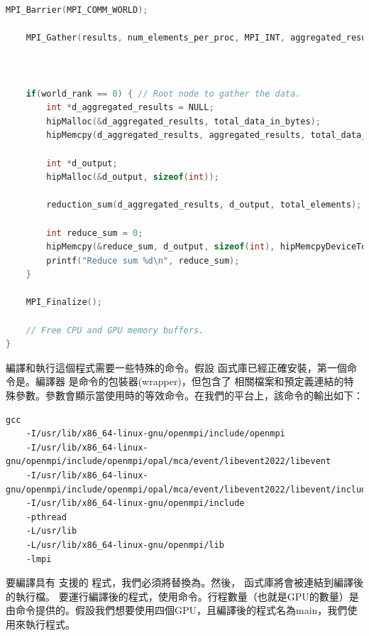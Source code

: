 \begin{lstlisting}[language=C, caption={用MPI設計多GPU程式}, captionpos=t, label={lst:multGPUs_mpi}]
    MPI_Barrier(MPI_COMM_WORLD);
    
    MPI_Gather(results, num_elements_per_proc, MPI_INT, aggregated_results, num_elements_per_proc, MPI_INT, 0, MPI_COMM_WORLD);



    if(world_rank == 0) { // Root node to gather the data.
        int *d_aggregated_results = NULL;
        hipMalloc(&d_aggregated_results, total_data_in_bytes);
        hipMemcpy(d_aggregated_results, aggregated_results, total_data_in_bytes, hipMemcpyHostToDevice);
        
        int *d_output;
        hipMalloc(&d_output, sizeof(int));
        
        reduction_sum(d_aggregated_results, d_output, total_elements);
        
        int reduce_sum = 0;
        hipMemcpy(&reduce_sum, d_output, sizeof(int), hipMemcpyDeviceToHost);
        printf("Reduce sum %d\n", reduce_sum);
    }
    
    MPI_Finalize();
    
    // Free CPU and GPU memory buffers.
}
\end{lstlisting}

編譯和執行這個程式需要一些特殊的命令。假設 函式庫已經正確安裝，第一個命令是。編譯器 是命令的包裝器(wrapper)，但包含了 相關檔案和預定義連結的特殊參數。參數會顯示當使用時的等效命令。在我們的平台上，該命令的輸出如下：

\begin{lstlisting}[numbers=none, caption={\bold{mpicc --showme}的輸出}, captionpos=t, label={lst:output_of_mpiccshowme}]
gcc
    -I/usr/lib/x86_64-linux-gnu/openmpi/include/openmpi
    -I/usr/lib/x86_64-linux-gnu/openmpi/include/openmpi/opal/mca/event/libevent2022/libevent
    -I/usr/lib/x86_64-linux-gnu/openmpi/include/openmpi/opal/mca/event/libevent2022/libevent/include
    -I/usr/lib/x86_64-linux-gnu/openmpi/include
    -pthread
    -L/usr/lib
    -L/usr/lib/x86_64-linux-gnu/openmpi/lib
    -lmpi
\end{lstlisting}

要編譯具有 支援的 程式，我們必須將替換為。然後， 函式庫將會被連結到編譯後的執行檔。
要運行編譯後的程式，使用命令。行程數量（也就是GPU的數量）是由命令提供的。假設我們想要使用四個GPU，且編譯後的程式名為main，我們使用來執行程式。

